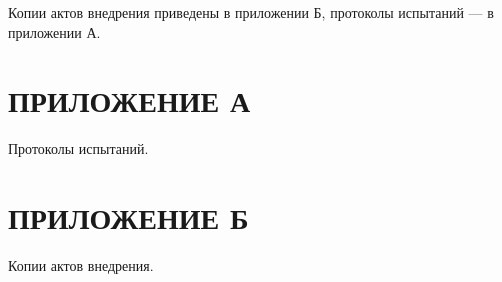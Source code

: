

Копии актов внедрения приведены в приложении Б, протоколы испытаний — в приложении А.

\newpage
\section*{ПРИЛОЖЕНИЕ А}

Протоколы испытаний.

\newpage
\section*{ПРИЛОЖЕНИЕ Б} %

Копии актов внедрения.


